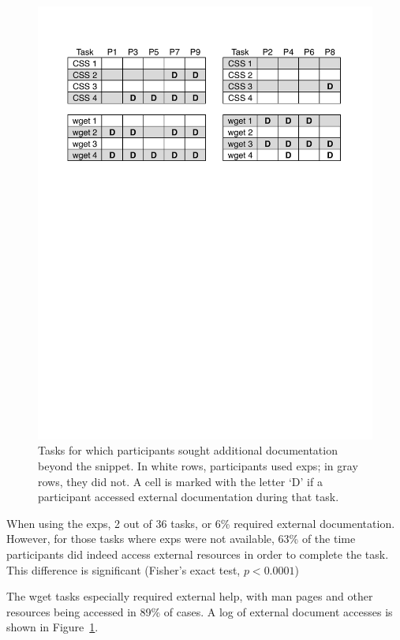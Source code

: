 \begin{figure}
\centering
\includegraphics[width=\columnwidth]{figures/doc_accesses}
\caption{%
Tasks for which participants sought additional documentation beyond the snippet. In white rows, participants used \glspl{exp}; in gray rows, they did not.
A cell is marked with the letter `D' if a participant accessed external documentation during that task.
}
\label{fig:doc_accesses}
\end{figure}

\begin{changes}
When using the \glspl{exp}, 2 out of 36 tasks, or 6\% required external documentation.
However, for those tasks where \glspl{exp} were not available, 63\% of the time participants did indeed access external resources in order to complete the task.
This difference is significant (Fisher's exact test, $p < 0.0001$)
\end{changes}
The wget tasks especially required external help, with man pages and other resources being accessed in 89\% of cases.  
A log of external document accesses is shown in Figure~\ref{fig:doc_accesses}. 


